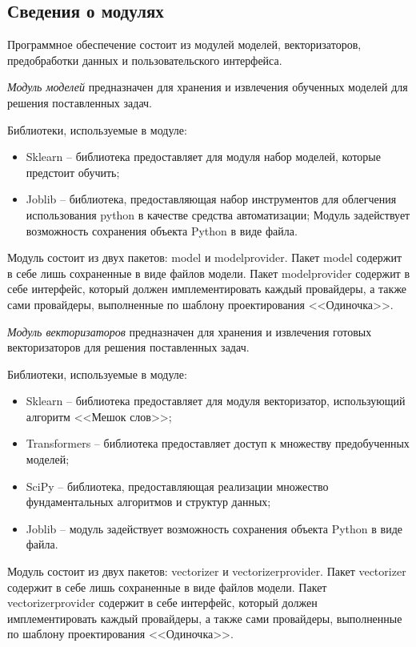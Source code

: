 \subsection{Сведения о модулях}

Программное обеспечение состоит из модулей моделей, векторизаторов, предобработки данных и пользовательского интерфейса.

\textit{Модуль моделей} предназначен для хранения и извлечения обученных моделей для решения поставленных задач.

Библиотеки, используемые в модуле:
\begin{itemize}
	\item Sklearn -- библиотека предоставляет для модуля набор моделей, которые предстоит обучить;
	\item Joblib \cite{joblib} -- библиотека, предоставляющая набор инструментов для облегчения использования python в качестве средства автоматизации; Модуль задействует возможность сохранения объекта Python в виде файла.
\end{itemize}

Модуль состоит из двух пакетов: model и modelprovider. 
Пакет model содержит в себе лишь сохраненные в виде файлов модели.
Пакет modelprovider содержит в себе интерфейс, который должен имплементировать каждый провайдеры, а также сами провайдеры, выполненные по шаблону проектирования <<Одиночка>>.


\textit{Модуль векторизаторов} предназначен для хранения и извлечения готовых векторизаторов для решения поставленных задач.

Библиотеки, используемые в модуле:
\begin{itemize}
	\item Sklearn -- библиотека предоставляет для модуля векторизатор, использующий алгоритм <<Мешок слов>>;
	\item Transformers \cite{transformers} -- библиотека предоставляет доступ к множеству предобученных моделей;
	\item SciPy \cite{scipy} -- библиотека, предоставляющая реализации множество фундаментальных алгоритмов и структур данных;
	\item Joblib \cite{joblib} -- модуль задействует возможность сохранения объекта Python в виде файла.
\end{itemize}

Модуль состоит из двух пакетов: vectorizer и vectorizerprovider. 
Пакет vectorizer содержит в себе лишь сохраненные в виде файлов модели.
Пакет vectorizerprovider содержит в себе интерфейс, который должен имплементировать каждый провайдеры, а также сами провайдеры, выполненные по шаблону проектирования <<Одиночка>>.


